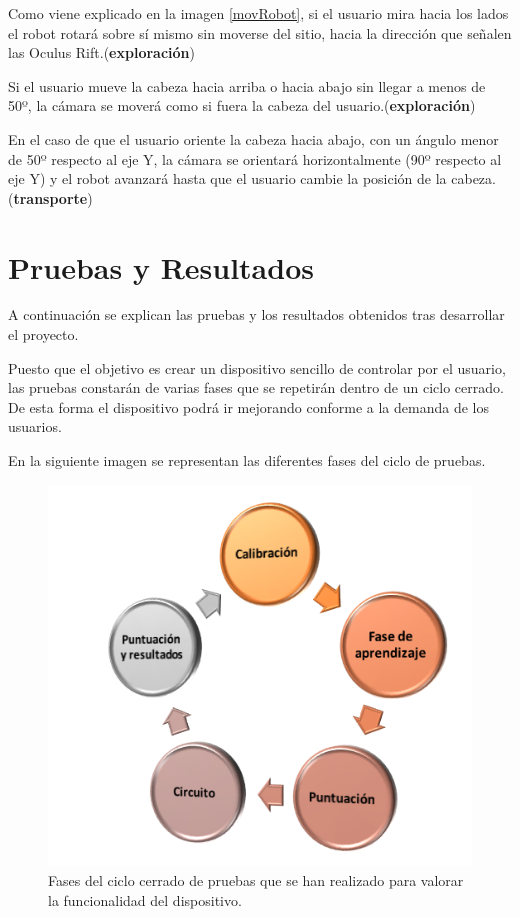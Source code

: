 \documentclass[twoside, 11pt]{epstfg}
\begin{document}
Como viene explicado en la imagen \ref{movRobot}, si el usuario mira hacia los lados el robot rotará sobre sí mismo sin moverse del sitio, hacia la dirección que señalen las Oculus Rift.(\textbf{exploración})

Si el usuario mueve la cabeza hacia arriba o hacia abajo sin llegar a menos de 50º, la cámara se moverá como si fuera la cabeza del usuario.(\textbf{exploración})

En el caso de que el usuario oriente la cabeza hacia abajo, con un ángulo menor de 50º respecto al eje Y, la cámara se orientará horizontalmente (90º respecto al eje Y) y el robot avanzará hasta que el usuario cambie la posición de la cabeza.(\textbf{transporte})

\chapter{Pruebas y Resultados}

A continuación se explican las pruebas y los resultados obtenidos tras desarrollar el proyecto.

Puesto que el objetivo es crear un dispositivo sencillo de controlar por el usuario, las pruebas constarán de varias fases que se repetirán dentro de un ciclo cerrado. De esta forma el dispositivo podrá ir mejorando conforme a la demanda de los usuarios.

En la siguiente imagen se representan las diferentes fases del ciclo de pruebas.

\begin{figure}[h!]
	\centerline{
		\mbox{\includegraphics[width=.60\textwidth]{images/CicloPruebas.png}}
	}
	\caption{Fases del ciclo cerrado de pruebas que se han realizado para valorar la funcionalidad del dispositivo.}
\end{figure}
\end{document}
